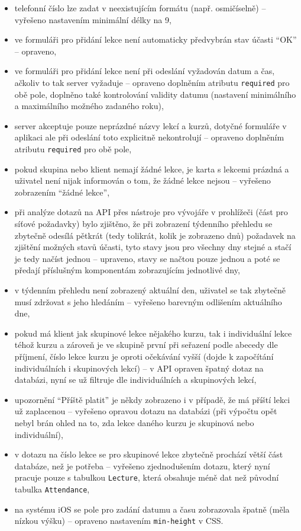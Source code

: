         \begin{itemize}
            \item telefonní číslo lze zadat v neexistujícím formátu (např. osmičíselně) -- vyřešeno nastavením minimální délky na 9,
            \item ve formuláři pro přidání lekce není automaticky předvybrán stav účasti \enquote{OK} -- opraveno,
            \item ve formuláři pro přidání lekce není při odeslání vyžadován datum a čas, ačkoliv to tak server vyžaduje -- opraveno doplněním atributu \verb|required| pro obě pole, doplněno také kontrolování validity datumu (nastavení minimálního a maximálního možného zadaného roku),
            \item server akceptuje pouze neprázdné názvy lekcí a kurzů, dotyčné formuláře v aplikaci ale při odeslání toto explicitně nekontrolují -- opraveno doplněním atributu \verb|required| pro obě pole,
            \item pokud skupina nebo klient nemají žádné lekce, je karta s lekcemi prázdná a uživatel není nijak informován o tom, že žádné lekce nejsou -- vyřešeno zobrazením \enquote{žádné lekce},
            \item při analýze dotazů na API přes nástroje pro vývojáře v prohlížeči (část pro síťové požadavky) bylo zjištěno, že při zobrazení týdenního přehledu se zbytečně odesílá pětkrát (tedy tolikrát, kolik je zobrazeno dnů) požadavek na zjištění možných stavů účasti, tyto stavy jsou pro všechny dny stejné a stačí je tedy načíst jednou -- upraveno, stavy se načtou pouze jednou a poté se předají příslušným komponentám zobrazujícím jednotlivé dny,
            \item v týdenním přehledu není zobrazený aktuální den, uživatel se tak zbytečně musí zdržovat s jeho hledáním -- vyřešeno barevným odlišením aktuálního dne,
            \item pokud má klient jak skupinové lekce nějakého kurzu, tak i individuální lekce téhož kurzu a zároveň je ve skupině první při seřazení podle abecedy dle příjmení, číslo lekce kurzu je oproti očekávání vyšší (dojde k započítání individuálních i skupinových lekcí) -- v API opraven špatný dotaz na databázi, nyní se už filtruje dle individuálních a skupinových lekcí,
            \item upozornění \enquote{Příště platit} je někdy zobrazeno i v případě, že má příští lekci už zaplacenou -- vyřešeno opravou dotazu na databázi (při výpočtu opět nebyl brán ohled na to, zda lekce daného kurzu je skupinová nebo individuální),
            \item v dotazu na číslo lekce se pro skupinové lekce zbytečně prochází větší část databáze, než je potřeba -- vyřešeno zjednodušením dotazu, který nyní pracuje pouze s tabulkou \verb|Lecture|, která obsahuje méně dat než původní tabulka \verb|Attendance|,
            \item na systému iOS se pole pro zadání datumu a času zobrazovala špatně (měla nízkou výšku) -- opraveno nastavením \verb|min-height| v CSS.
        \end{itemize}
    
